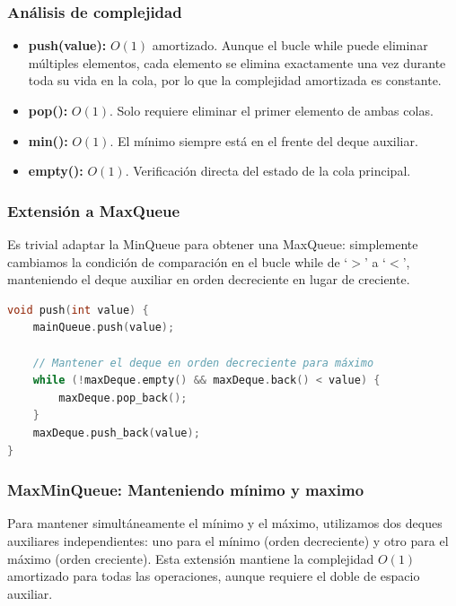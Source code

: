 \documentclass[12pt,a4paper]{article}
\begin{document}
\subsubsection{Análisis de complejidad}

\begin{itemize}
    \item \textbf{push(value):} $O(1)$ amortizado. Aunque el bucle while puede eliminar múltiples elementos, cada elemento se elimina exactamente una vez durante toda su vida en la cola, por lo que la complejidad amortizada es constante.
    
    \item \textbf{pop():} $O(1)$. Solo requiere eliminar el primer elemento de ambas colas.
    
    \item \textbf{min():} $O(1)$. El mínimo siempre está en el frente del deque auxiliar.
    
    \item \textbf{empty():} $O(1)$. Verificación directa del estado de la cola principal.
\end{itemize}

\subsubsection{Extensión a MaxQueue}

Es trivial adaptar la MinQueue para obtener una MaxQueue: simplemente cambiamos la condición de comparación en el bucle while de `$>$' a `$<$', manteniendo el deque auxiliar en orden decreciente en lugar de creciente.

\begin{lstlisting}[language=C++, label=lst:maxqueue_simple]
void push(int value) {
    mainQueue.push(value);
    
    // Mantener el deque en orden decreciente para máximo
    while (!maxDeque.empty() && maxDeque.back() < value) {
        maxDeque.pop_back();
    }
    maxDeque.push_back(value);
}
\end{lstlisting}

\subsubsection{MaxMinQueue: Manteniendo mínimo y maximo}

Para mantener simultáneamente el mínimo y el máximo, utilizamos dos deques auxiliares independientes: uno para el mínimo (orden decreciente) y otro para el máximo (orden creciente). Esta extensión mantiene la complejidad $O(1)$ amortizado para todas las operaciones, aunque requiere el doble de espacio auxiliar.
\end{document}
